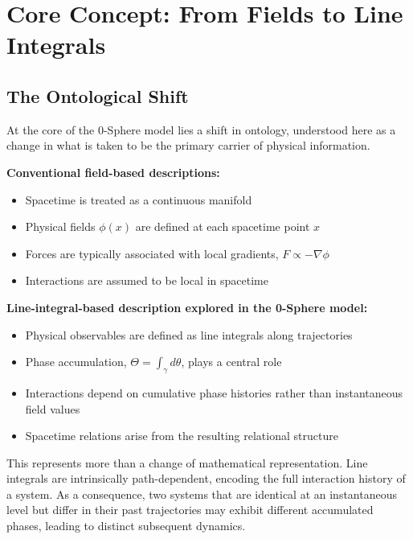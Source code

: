 \documentclass[12pt,letterpaper]{article}
\begin{document}

\section{Core Concept: From Fields to Line Integrals}
\label{sec:core_concept}

\justifying


\subsection{The Ontological Shift}
\label{subsec:ontological_shift}

At the core of the 0-Sphere model lies a shift in ontology, understood here as a change in what is taken to be the primary carrier of physical information.

\textbf{Conventional field-based descriptions:}
\begin{itemize}
\item Spacetime is treated as a continuous manifold
\item Physical fields $\phi(x)$ are defined at each spacetime point $x$
\item Forces are typically associated with local gradients, $F \propto -\nabla \phi$
\item Interactions are assumed to be local in spacetime
\end{itemize}

\textbf{Line-integral-based description explored in the 0-Sphere model:}
\begin{itemize}
\item Physical observables are defined as line integrals along trajectories
\item Phase accumulation, $\Theta = \int_\gamma d\theta$, plays a central role
\item Interactions depend on cumulative phase histories rather than instantaneous field values
\item Spacetime relations arise from the resulting relational structure
\end{itemize}

This represents more than a change of mathematical representation. Line integrals are intrinsically path-dependent, encoding the full interaction history of a system. As a consequence, two systems that are identical at an instantaneous level but differ in their past trajectories may exhibit different accumulated phases, leading to distinct subsequent dynamics.
\end{document}
